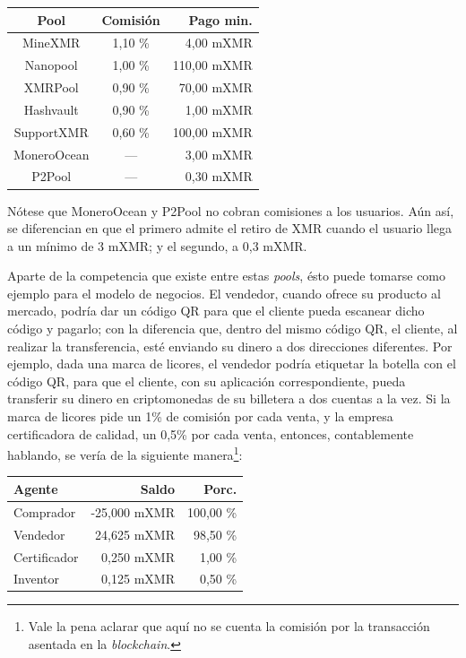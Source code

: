 \documentclass[12pt,a4paper]{article}
\begin{document}
\begin{center}
\begin{tabular}{|c|c|r|}
\hline 
\textbf{Pool} & \textbf{Comisión} & \textbf{Pago min.} \\ 
\hline 
MineXMR & 1,10 \% & 4,00 mXMR \\ 
\hline 
Nanopool & 1,00 \% & 110,00 mXMR \\ 
\hline 
XMRPool & 0,90 \% & 70,00 mXMR \\ 
\hline 
Hashvault & 0,90 \% & 1,00 mXMR \\ 
\hline 
SupportXMR & 0,60 \% & 100,00 mXMR \\ 
\hline 
MoneroOcean & — & 3,00 mXMR \\ 
\hline 
P2Pool & — & 0,30 mXMR \\ 
\hline 
\end{tabular} 
\end{center}

Nótese que MoneroOcean y P2Pool no cobran comisiones a los usuarios. Aún así, se diferencian en que el primero admite el retiro de XMR cuando el usuario llega a un mínimo de 3 mXMR; y el segundo, a 0,3 mXMR.

Aparte de la competencia que existe entre estas \textit{pools}, ésto puede tomarse como ejemplo para el modelo de negocios. El vendedor, cuando ofrece su producto al mercado, podría dar un código QR para que el cliente pueda escanear dicho código y pagarlo; con la diferencia que, dentro del mismo código QR, el cliente, al realizar la transferencia, esté enviando su dinero a dos direcciones diferentes. Por ejemplo, dada una marca de licores, el vendedor podría etiquetar la botella con el código QR, para que el cliente, con su aplicación correspondiente, pueda transferir su dinero en criptomonedas de su billetera a dos cuentas a la vez. Si la marca de licores pide un 1\% de comisión por cada venta, y la empresa certificadora de calidad, un 0,5\% por cada venta, entonces, contablemente hablando, se vería de la siguiente manera\footnote{Vale la pena aclarar que aquí no se cuenta la comisión por la transacción asentada en la \textit{blockchain}.}:

\begin{center}
\begin{tabular}{|l|r|r|}
\hline 
\textbf{Agente} & \textbf{Saldo} & \textbf{Porc.} \\ 
\hline 
Comprador & -25,000 mXMR & 100,00 \% \\ 
\hline 
Vendedor & 24,625 mXMR & 98,50 \% \\
\hline 
Certificador & 0,250 mXMR & 1,00 \% \\ 
\hline 
Inventor & 0,125 mXMR & 0,50 \% \\ 
\hline 
\end{tabular} 
\end{center}
\end{document}

